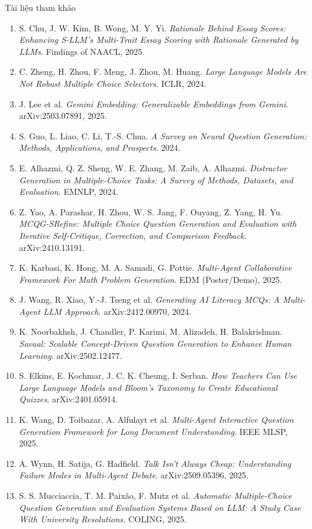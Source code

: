 \documentclass[aspectratio=169,11pt]{beamer}
\begin{document}
\begin{frame}[allowframebreaks]{Tài liệu tham khảo}
\begin{enumerate}
    \item S. Chu, J. W. Kim, B. Wong, M. Y. Yi. \emph{Rationale Behind Essay Scores: Enhancing S-LLM's Multi-Trait Essay Scoring with Rationale Generated by LLMs}. Findings of NAACL, 2025.
    \item C. Zheng, H. Zhou, F. Meng, J. Zhou, M. Huang. \emph{Large Language Models Are Not Robust Multiple Choice Selectors}. ICLR, 2024.
    \item J. Lee et al. \emph{Gemini Embedding: Generalizable Embeddings from Gemini}. arXiv:2503.07891, 2025.
    \item S. Guo, L. Liao, C. Li, T.-S. Chua. \emph{A Survey on Neural Question Generation: Methods, Applications, and Prospects}. 2024.
    \item E. Alhazmi, Q. Z. Sheng, W. E. Zhang, M. Zaib, A. Alhazmi. \emph{Distractor Generation in Multiple-Choice Tasks: A Survey of Methods, Datasets, and Evaluation}. EMNLP, 2024.
    \item Z. Yao, A. Parashar, H. Zhou, W. S. Jang, F. Ouyang, Z. Yang, H. Yu. \emph{MCQG-SRefine: Multiple Choice Question Generation and Evaluation with Iterative Self-Critique, Correction, and Comparison Feedback}. arXiv:2410.13191.
    \item K. Karbasi, K. Hong, M. A. Samadi, G. Pottie. \emph{Multi-Agent Collaborative Framework For Math Problem Generation}. EDM (Poster/Demo), 2025.
    \item J. Wang, R. Xiao, Y.-J. Tseng et al. \emph{Generating AI Literacy MCQs: A Multi-Agent LLM Approach}. arXiv:2412.00970, 2024.
    \item K. Noorbakhsh, J. Chandler, P. Karimi, M. Alizadeh, H. Balakrishnan. \emph{Savaal: Scalable Concept-Driven Question Generation to Enhance Human Learning}. arXiv:2502.12477.
    \item S. Elkins, E. Kochmar, J. C. K. Cheung, I. Serban. \emph{How Teachers Can Use Large Language Models and Bloom's Taxonomy to Create Educational Quizzes}. arXiv:2401.05914.
    \item K. Wang, D. Toibazar, A. Alfulayt et al. \emph{Multi-Agent Interactive Question Generation Framework for Long Document Understanding}. IEEE MLSP, 2025.
    \item A. Wynn, H. Satija, G. Hadfield. \emph{Talk Isn't Always Cheap: Understanding Failure Modes in Multi-Agent Debate}. arXiv:2509.05396, 2025.
    \item S. S. Mucciaccia, T. M. Paixão, F. Mutz et al. \emph{Automatic Multiple-Choice Question Generation and Evaluation Systems Based on LLM: A Study Case With University Resolutions}. COLING, 2025.

\end{enumerate}
\end{frame}
\end{document}
